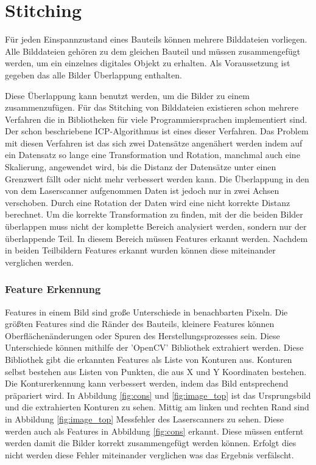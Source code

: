 
\chapter{Stitching}

Für jeden Einspannzustand eines Bauteils können mehrere Bilddateien vorliegen.
Alle Bilddateien gehören zu dem gleichen Bauteil und müssen 
zusammengefügt werden, um ein einzelnes digitales Objekt zu erhalten. 
Als Voraussetzung ist gegeben das alle Bilder Überlappung enthalten.

Diese Überlappung kann benutzt werden, um die Bilder zu einem zusammenzufügen.
Für das Stitching von Bilddateien existieren schon mehrere Verfahren die in Bibliotheken
für viele Programmiersprachen implementiert sind. Der schon beschriebene ICP-Algorithmus
ist eines dieser Verfahren. Das Problem mit diesen Verfahren ist das sich zwei 
Datensätze angenähert werden indem auf ein Datensatz so lange eine 
Transformation und Rotation, manchmal auch eine Skalierung, angewendet wird, bis
die Distanz der Datensätze unter einen Grenzwert fällt oder nicht mehr verbessert
werden kann. Die Überlappung in den von dem Laserscanner aufgenommen Daten ist jedoch 
nur in zwei Achsen verschoben. Durch eine Rotation der Daten wird eine nicht korrekte 
Distanz berechnet.
Um die korrekte Transformation zu finden, mit der die beiden Bilder überlappen
muss nicht der komplette Bereich analysiert werden, sondern nur der überlappende Teil.
In diesem Bereich müssen Features erkannt werden. 
Nachdem in beiden Teilbildern Features erkannt wurden können diese miteinander
verglichen werden.

\subsection{Feature Erkennung}

Features in einem Bild sind große Unterschiede in benachbarten Pixeln. Die größten
Features sind die Ränder des Bauteils, kleinere Features können Oberflächenänderungen 
oder Spuren des Herstellungsprozesses sein. Diese Unterschiede können mithilfe 
der 'OpenCV' Bibliothek extrahiert werden. Diese Bibliothek gibt die erkannten 
Features als Liste von Konturen aus. Konturen selbst bestehen aus Listen von 
Punkten, die aus X und Y Koordinaten bestehen. Die Konturerkennung kann verbessert 
werden, indem das Bild entsprechend präpariert wird. In Abbildung \ref{fig:cons} und
\ref{fig:image_top} ist das Ursprungsbild und die extrahierten Konturen zu sehen.
Mittig am linken und rechten Rand sind in Abbildung \ref{fig:image_top} 
Messfehler des Laserscanners zu sehen. Diese werden auch als Features in 
Abbildung \ref{fig:cons} erkannt. Diese müssen entfernt werden damit die Bilder 
korrekt zusammengefügt werden können. Erfolgt dies nicht werden diese Fehler miteinander
verglichen was das Ergebnis verfälscht.


